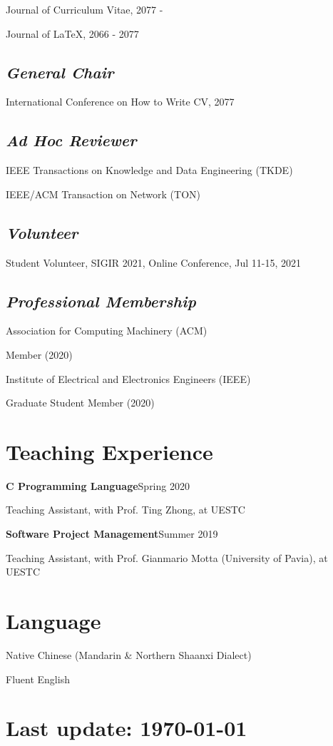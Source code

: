 \documentclass{article}
\newcommand{\CVsection}[1]{
    \vspace{-8pt}
    \section*{#1}
    \vspace{-4pt}
}
\newcommand{\CVsubsection}[1]{
    \subsection*{\textnormal{\textit{#1}}}
}
\begin{document}
Journal of Curriculum Vitae, 2077 -

Journal of \LaTeX, 2066 - 2077

\CVsubsection{General Chair}
\vspace{-4pt}
\indent

International Conference on How to Write CV, 2077

\CVsubsection{Ad Hoc Reviewer}
\vspace{-4pt}
\indent

IEEE Transactions on Knowledge and Data Engineering (TKDE)

IEEE/ACM Transaction on Network (TON)

\CVsubsection{Volunteer}
\vspace{-4pt}
\indent

Student Volunteer, SIGIR 2021, Online Conference, Jul 11-15, 2021

\CVsubsection{Professional Membership}
\vspace{-4pt}
\indent

Association for Computing Machinery (ACM)

\hspace{2em}Member (2020)

Institute of Electrical and Electronics Engineers (IEEE)

\hspace{2em}Graduate Student Member (2020)









\CVsection{Teaching Experience}
\indent

\textbf{C Programming Language}\hfill Spring 2020

\hspace{2em}Teaching Assistant, with Prof. Ting Zhong, at UESTC

\textbf{Software Project Management}\hfill Summer 2019

\hspace{2em}Teaching Assistant, with Prof. Gianmario Motta (University of Pavia), at UESTC




\CVsection{Language}
\indent

Native Chinese (Mandarin \& Northern Shaanxi Dialect)

Fluent English


\vfill

\section*{\hfill Last update: \today}
\end{document}
